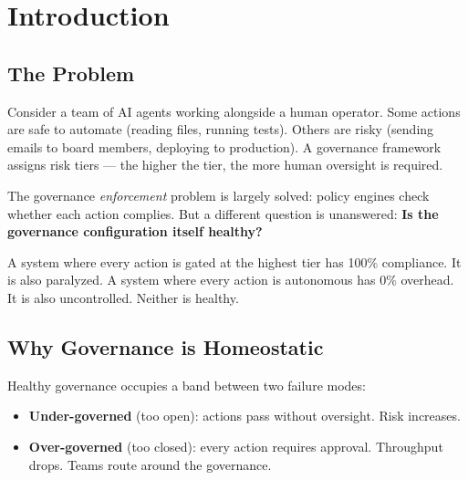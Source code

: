 \documentclass[sigconf,nonacm]{acmart}
\begin{document}


\maketitle

\section{Introduction}

\subsection{The Problem}

Consider a team of AI agents working alongside a human operator. Some
actions are safe to automate (reading files, running tests). Others are
risky (sending emails to board members, deploying to production). A
governance framework assigns risk tiers --- the higher the tier, the more
human oversight is required.

The governance \emph{enforcement} problem is largely solved: policy
engines check whether each action complies. But a different question is
unanswered: \textbf{Is the governance configuration itself healthy?}

A system where every action is gated at the highest tier has 100\%
compliance. It is also paralyzed. A system where every action is
autonomous has 0\% overhead. It is also uncontrolled. Neither is healthy.

\subsection{Why Governance is Homeostatic}

Healthy governance occupies a band between two failure modes:

\begin{itemize}[leftmargin=*]
  \item \textbf{Under-governed} (too open): actions pass without oversight.
    Risk increases.
  \item \textbf{Over-governed} (too closed): every action requires approval.
    Throughput drops. Teams route around the governance.
\end{itemize}
\end{document}
